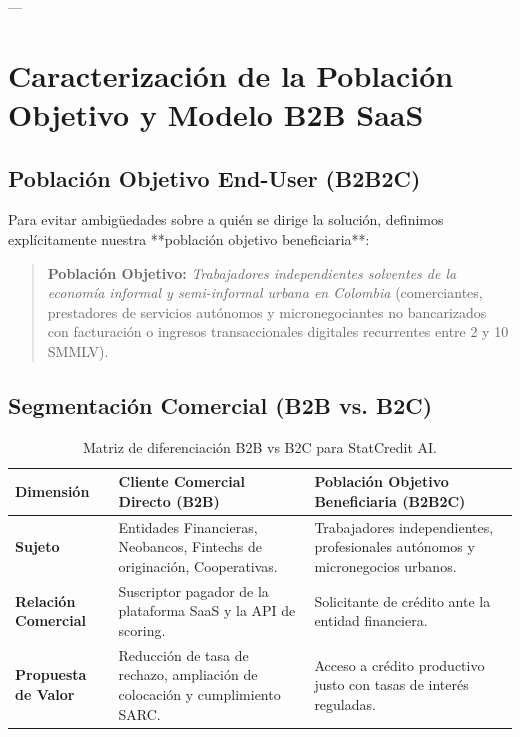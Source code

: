 \documentclass[11pt,a4paper]{article}
\begin{document}
---

\section{Caracterización de la Población Objetivo y Modelo B2B SaaS}

\subsection{Población Objetivo End-User (B2B2C)}
Para evitar ambigüedades sobre a quién se dirige la solución, definimos explícitamente nuestra **población objetivo beneficiaria**:
\begin{quote}
\textbf{Población Objetivo:} \textit{Trabajadores independientes solventes de la economía informal y semi-informal urbana en Colombia} (comerciantes, prestadores de servicios autónomos y micronegociantes no bancarizados con facturación o ingresos transaccionales digitales recurrentes entre 2 y 10 SMMLV).
\end{quote}

\subsection{Segmentación Comercial (B2B vs. B2C)}
\begin{table}[h!]
\centering
\small
\begin{tabular}{p{4.5cm} p{5.5cm} p{5.5cm}}
\toprule
\textbf{Dimensión} & \textbf{Cliente Comercial Directo (B2B)} & \textbf{Población Objetivo Beneficiaria (B2B2C)} \\
\midrule
\textbf{Sujeto} & Entidades Financieras, Neobancos, Fintechs de originación, Cooperativas. & Trabajadores independientes, profesionales autónomos y micronegocios urbanos. \\
\midrule
\textbf{Relación Comercial} & Suscriptor pagador de la plataforma SaaS y la API de scoring. & Solicitante de crédito ante la entidad financiera. \\
\midrule
\textbf{Propuesta de Valor} & Reducción de tasa de rechazo, ampliación de colocación y cumplimiento SARC. & Acceso a crédito productivo justo con tasas de interés reguladas. \\
\bottomrule
\end{tabular}
\caption{Matriz de diferenciación B2B vs B2C para StatCredit AI.}
\end{table}
\end{document}
